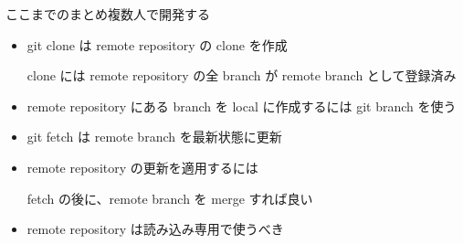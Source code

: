 % 
% 
% 
% 

\begin{frame}[t]{ここまでのまとめ}{複数人で開発する}

  \begin{itemize}
  \item git clone は remote repository の clone を作成

    clone には remote repository の全 branch が remote branch として登録済み
    \vspace{2ex}

  \item remote repository にある branch を local に作成するには git branch を使う
    \vspace{2ex}

  \item git fetch は remote branch を最新状態に更新
    \vspace{2ex}

  \item remote repository の更新を適用するには

    fetch の後に、remote branch を merge すれば良い
    \vspace{2ex}

  \item remote repository は読み込み専用で使うべき
  \end{itemize}

\end{frame}
